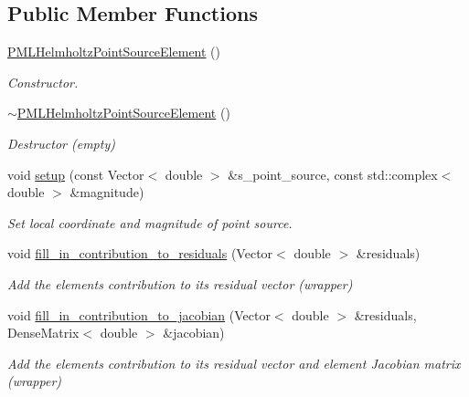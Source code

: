 \subsection*{Public Member Functions}
\begin{DoxyCompactItemize}
\item 
\hyperlink{classoomph_1_1PMLHelmholtzPointSourceElement_a0092ffd22a364d8d4cb9013880a0d35b}{P\+M\+L\+Helmholtz\+Point\+Source\+Element} ()
\begin{DoxyCompactList}\small\item\em Constructor. \end{DoxyCompactList}\item 
\hyperlink{classoomph_1_1PMLHelmholtzPointSourceElement_a2d2f0c6620a08ce57dce4a5ee97fc079}{$\sim$\+P\+M\+L\+Helmholtz\+Point\+Source\+Element} ()
\begin{DoxyCompactList}\small\item\em Destructor (empty) \end{DoxyCompactList}\item 
void \hyperlink{classoomph_1_1PMLHelmholtzPointSourceElement_ad8a39b19e2387c97d46dd656f54e4cda}{setup} (const Vector$<$ double $>$ \&s\+\_\+point\+\_\+source, const std\+::complex$<$ double $>$ \&magnitude)
\begin{DoxyCompactList}\small\item\em Set local coordinate and magnitude of point source. \end{DoxyCompactList}\item 
void \hyperlink{classoomph_1_1PMLHelmholtzPointSourceElement_aa35993cf40bb93086076247797653397}{fill\+\_\+in\+\_\+contribution\+\_\+to\+\_\+residuals} (Vector$<$ double $>$ \&residuals)
\begin{DoxyCompactList}\small\item\em Add the element\textquotesingle{}s contribution to its residual vector (wrapper) \end{DoxyCompactList}\item 
void \hyperlink{classoomph_1_1PMLHelmholtzPointSourceElement_a046f79e3e1dcb266027366324e1e956d}{fill\+\_\+in\+\_\+contribution\+\_\+to\+\_\+jacobian} (Vector$<$ double $>$ \&residuals, Dense\+Matrix$<$ double $>$ \&jacobian)
\begin{DoxyCompactList}\small\item\em Add the element\textquotesingle{}s contribution to its residual vector and element Jacobian matrix (wrapper) \end{DoxyCompactList}\end{DoxyCompactItemize}
